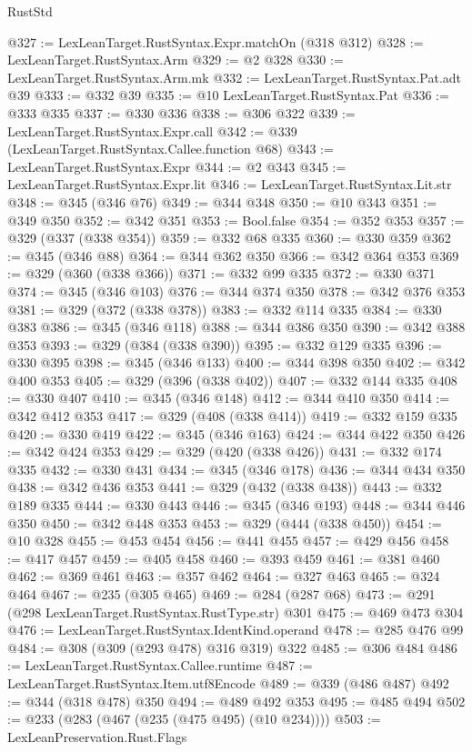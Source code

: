 \begin{lexlean}{RustStd}
\begin{coremodule}
@327 := LexLeanTarget.RustSyntax.Expr.matchOn (@318 @312)
@328 := LexLeanTarget.RustSyntax.Arm
@329 := @2 @328
@330 := LexLeanTarget.RustSyntax.Arm.mk
@332 := LexLeanTarget.RustSyntax.Pat.adt @39
@333 := @332 @39
@335 := @10 LexLeanTarget.RustSyntax.Pat
@336 := @333 @335
@337 := @330 @336
@338 := @306 @322
@339 := LexLeanTarget.RustSyntax.Expr.call
@342 := @339 (LexLeanTarget.RustSyntax.Callee.function @68)
@343 := LexLeanTarget.RustSyntax.Expr
@344 := @2 @343
@345 := LexLeanTarget.RustSyntax.Expr.lit
@346 := LexLeanTarget.RustSyntax.Lit.str
@348 := @345 (@346 @76)
@349 := @344 @348
@350 := @10 @343
@351 := @349 @350
@352 := @342 @351
@353 := Bool.false
@354 := @352 @353
@357 := @329 (@337 (@338 @354))
@359 := @332 @68 @335
@360 := @330 @359
@362 := @345 (@346 @88)
@364 := @344 @362 @350
@366 := @342 @364 @353
@369 := @329 (@360 (@338 @366))
@371 := @332 @99 @335
@372 := @330 @371
@374 := @345 (@346 @103)
@376 := @344 @374 @350
@378 := @342 @376 @353
@381 := @329 (@372 (@338 @378))
@383 := @332 @114 @335
@384 := @330 @383
@386 := @345 (@346 @118)
@388 := @344 @386 @350
@390 := @342 @388 @353
@393 := @329 (@384 (@338 @390))
@395 := @332 @129 @335
@396 := @330 @395
@398 := @345 (@346 @133)
@400 := @344 @398 @350
@402 := @342 @400 @353
@405 := @329 (@396 (@338 @402))
@407 := @332 @144 @335
@408 := @330 @407
@410 := @345 (@346 @148)
@412 := @344 @410 @350
@414 := @342 @412 @353
@417 := @329 (@408 (@338 @414))
@419 := @332 @159 @335
@420 := @330 @419
@422 := @345 (@346 @163)
@424 := @344 @422 @350
@426 := @342 @424 @353
@429 := @329 (@420 (@338 @426))
@431 := @332 @174 @335
@432 := @330 @431
@434 := @345 (@346 @178)
@436 := @344 @434 @350
@438 := @342 @436 @353
@441 := @329 (@432 (@338 @438))
@443 := @332 @189 @335
@444 := @330 @443
@446 := @345 (@346 @193)
@448 := @344 @446 @350
@450 := @342 @448 @353
@453 := @329 (@444 (@338 @450))
@454 := @10 @328
@455 := @453 @454
@456 := @441 @455
@457 := @429 @456
@458 := @417 @457
@459 := @405 @458
@460 := @393 @459
@461 := @381 @460
@462 := @369 @461
@463 := @357 @462
@464 := @327 @463
@465 := @324 @464
@467 := @235 (@305 @465)
@469 := @284 (@287 @68)
@473 := @291 (@298 LexLeanTarget.RustSyntax.RustType.str) @301
@475 := @469 @473 @304
@476 := LexLeanTarget.RustSyntax.IdentKind.operand
@478 := @285 @476 @99
@484 := @308 (@309 (@293 @478) @316 @319) @322
@485 := @306 @484
@486 := LexLeanTarget.RustSyntax.Callee.runtime
@487 := LexLeanTarget.RustSyntax.Item.utf8Encode
@489 := @339 (@486 @487)
@492 := @344 (@318 @478) @350
@494 := @489 @492 @353
@495 := @485 @494
@502 := @233 (@283 (@467 (@235 (@475 @495) (@10 @234))))
@503 := LexLeanPreservation.Rust.Flags

\end{coremodule}
\end{lexlean}
